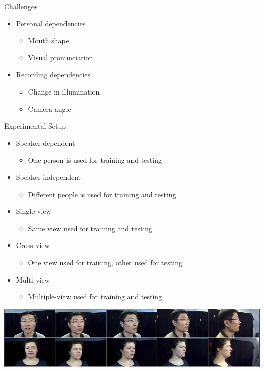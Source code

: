 \documentclass{beamer}
\begin{document}
\begin{frame}{Challenges}
    \begin{itemize}
        \item Personal dependencies
        \begin{itemize}
            \item Mouth shape 
            \item Visual pronunciation  
        \end{itemize}
        \item Recording dependencies 
        \begin{itemize}
            \item Change in illumination 
            \item Camera angle
        \end{itemize}
    \end{itemize}
\end{frame}

\begin{frame}{Experimental Setup}
    \begin{itemize}
        \item Speaker dependent
        \begin{itemize}
        \item One person is used for training and testing
        \end{itemize}
        \item Speaker independent
        \begin{itemize}
        \item Different people is used for training and testing
        \end{itemize}
    \end{itemize}
    \begin{itemize}
        \item Single-view 
        \begin{itemize}
        \item Same view used for training and testing
        \end{itemize}
        \item Cross-view 
        \begin{itemize}
        \item One view used for training, other used for testing
        \end{itemize}
        \item Multi-view 
        \begin{itemize}
        \item Multiple-view used for training and testing
        \end{itemize}
    \end{itemize}
    \begin{center}
    \includegraphics[width=\textwidth]{fig/ouluFullView.jpg}   
    \end{center}
\end{frame}
\end{document}
